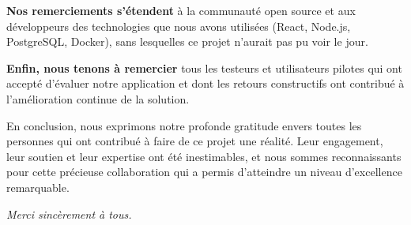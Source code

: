 \vspace{0.8cm}

\textbf{Nos remerciements s'étendent} à la communauté open source et aux développeurs des technologies que nous avons utilisées (React, Node.js, PostgreSQL, Docker), sans lesquelles ce projet n'aurait pas pu voir le jour.

\vspace{0.8cm}

\textbf{Enfin, nous tenons à remercier} tous les testeurs et utilisateurs pilotes qui ont accepté d'évaluer notre application et dont les retours constructifs ont contribué à l'amélioration continue de la solution.

\vspace{1cm}

En conclusion, nous exprimons notre profonde gratitude envers toutes les personnes qui ont contribué à faire de ce projet une réalité. Leur engagement, leur soutien et leur expertise ont été inestimables, et nous sommes reconnaissants pour cette précieuse collaboration qui a permis d'atteindre un niveau d'excellence remarquable.

\vspace{1cm}

\begin{center}
\textit{Merci sincèrement à tous.}
\end{center}
